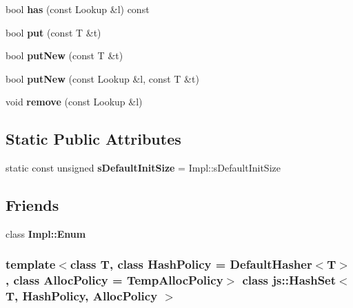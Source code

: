 \begin{DoxyCompactItemize}
\item 
\hypertarget{classjs_1_1_hash_set_ace5f9b823d7fcdec8abb024af29c477f}{bool {\bfseries has} (const Lookup \&l) const }\label{classjs_1_1_hash_set_ace5f9b823d7fcdec8abb024af29c477f}

\item 
\hypertarget{classjs_1_1_hash_set_a761772ec1dce8e9f01ea16004e11eb42}{bool {\bfseries put} (const T \&t)}\label{classjs_1_1_hash_set_a761772ec1dce8e9f01ea16004e11eb42}

\item 
\hypertarget{classjs_1_1_hash_set_acce2fc6e44676bda01ba9ba814f551c0}{bool {\bfseries put\-New} (const T \&t)}\label{classjs_1_1_hash_set_acce2fc6e44676bda01ba9ba814f551c0}

\item 
\hypertarget{classjs_1_1_hash_set_a4259a9b022ac4021facdee28ba6cdcd1}{bool {\bfseries put\-New} (const Lookup \&l, const T \&t)}\label{classjs_1_1_hash_set_a4259a9b022ac4021facdee28ba6cdcd1}

\item 
\hypertarget{classjs_1_1_hash_set_a29d585fbd24b5623c88c0c74d2413f29}{void {\bfseries remove} (const Lookup \&l)}\label{classjs_1_1_hash_set_a29d585fbd24b5623c88c0c74d2413f29}

\end{DoxyCompactItemize}
\subsection*{Static Public Attributes}
\begin{DoxyCompactItemize}
\item 
\hypertarget{classjs_1_1_hash_set_a86a97844456379192e43d1116de9b073}{static const unsigned {\bfseries s\-Default\-Init\-Size} = Impl\-::s\-Default\-Init\-Size}\label{classjs_1_1_hash_set_a86a97844456379192e43d1116de9b073}

\end{DoxyCompactItemize}
\subsection*{Friends}
\begin{DoxyCompactItemize}
\item 
\hypertarget{classjs_1_1_hash_set_ac2ba4b9aa066ee5fb781cf50b128569c}{class {\bfseries Impl\-::\-Enum}}\label{classjs_1_1_hash_set_ac2ba4b9aa066ee5fb781cf50b128569c}

\end{DoxyCompactItemize}
\subsubsection*{template$<$class T, class Hash\-Policy = Default\-Hasher$<$\-T$>$, class Alloc\-Policy = Temp\-Alloc\-Policy$>$ class js\-::\-Hash\-Set$<$ T, Hash\-Policy, Alloc\-Policy $>$}



